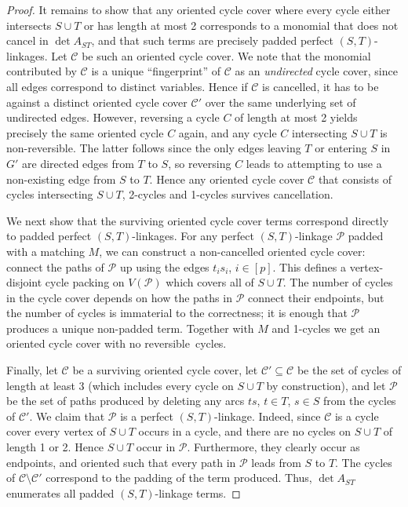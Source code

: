 \documentclass{theoretics}
\newcommand{\cC}{\ensuremath{\mathcal C}\xspace}
\newcommand{\cP}{\ensuremath{\mathcal P}\xspace}
\begin{document}
\begin{proof}
  It remains to show that any oriented cycle cover where every cycle either
  intersects $S \cup T$ or has length at most 2 corresponds to a monomial
  that does not cancel in $\det A_{ST}$, and that such terms are precisely
  padded perfect $(S,T)$-linkages. Let $\cC$ be such an oriented cycle cover.
  We note that the monomial contributed by $\cC$ is a unique ``fingerprint'' of $\cC$
  as an \emph{undirected} cycle cover, since all edges correspond to
  distinct variables. Hence if $\cC$ is cancelled, it has to be
  against a distinct oriented cycle cover $\cC'$ over the same
  underlying set of undirected edges. However, reversing a cycle $C$ of
  length at most 2 yields precisely the same oriented cycle $C$ again,
  and any cycle $C$ intersecting $S \cup T$ is non-reversible.
  The latter follows since the only edges leaving $T$ or entering $S$ in $G'$ are
  directed edges from $T$ to $S$, so reversing $C$ leads to attempting to use a
  non-existing edge from $S$ to $T$.
  Hence any oriented cycle cover $\cC$ that consists of cycles intersecting $S \cup T$, 
  2-cycles and 1-cycles survives cancellation. 

  We next show that the surviving oriented cycle cover terms
  correspond directly to padded perfect $(S,T)$-linkages.
  For any perfect $(S,T)$-linkage $\cP$ padded with a matching $M$, 
  we can construct a non-cancelled oriented cycle cover:
  connect the paths of $\cP$ up using the edges $t_is_i$, $i \in [p]$.
  This defines a vertex-disjoint cycle packing on $V(\cP)$ which covers all of $S \cup T$.
  The number of cycles in the cycle cover depends on how the paths in
  $\cP$ connect their endpoints, but the number of cycles is immaterial
  to the correctness; it is enough that $\cP$ produces a unique
  non-padded term. Together with $M$ and 1-cycles we get an oriented
  cycle cover with no reversible~cycles. 

  Finally, let $\cC$ be a surviving oriented cycle cover,
  let $\cC' \subseteq \cC$ be the set of cycles of length at least 3
  (which includes every cycle on $S \cup T$ by construction),
  and let $\cP$ be the set of paths produced by deleting any arcs
  $ts$, $t \in T$, $s \in S$ from the cycles of $\cC'$.
  We claim that $\cP$ is a perfect $(S,T)$-linkage. 
  Indeed, since $\cC$ is a cycle cover every vertex of $S \cup T$
  occurs in a cycle, and there are no cycles on $S \cup T$ of length 1 or 2.
  Hence $S \cup T$ occur in $\cP$. Furthermore, they clearly occur as
  endpoints, and oriented such that every path in $\cP$ leads from $S$
  to $T$. The cycles of $\cC \setminus \cC'$ correspond to the padding 
  of the term produced. 
  Thus, $\det A_{ST}$ enumerates all padded $(S, T)$-linkage terms.
\end{proof}
\end{document}
